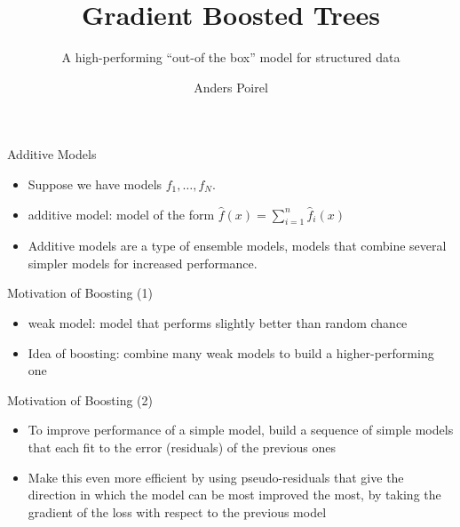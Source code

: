 \documentclass{beamer}
\title{Gradient Boosted Trees}
\subtitle{A high-performing ``out-of the box'' model for structured data}
\author{Anders Poirel}
\institute{DSS@UCSC}
\begin{document}
\maketitle

    \begin{frame}{Additive Models}
        \begin{itemize}
            \item Suppose we have models $f_1, \ldots, f_N$.
            \item \alert{additive model}: model of the form $\hat{f}(x) = \sum_{i = 1}^n \hat{f}_i (x)$
        
            \item Additive models are a type of \alert{ensemble} models, models that combine several simpler models for increased performance. 
        \end{itemize}   
    \end{frame}

    \begin{frame}{Motivation of Boosting (1)}
        \begin{itemize}
            \item \alert{weak} model: model that performs slightly better than random  chance
            \item Idea of \alert{boosting}: combine many weak models to build a higher-performing one
        \end{itemize}
    \end{frame}

    \begin{frame}{Motivation of Boosting (2)}
        \begin{itemize}
            \item To improve performance of a simple model, build a \alert{sequence} of simple models that each fit to the error (\alert{residuals}) of the previous ones
            \item Make this even more efficient by using \alert{pseudo-residuals} that give the direction in which the model can be most improved the most, by taking the gradient of the loss with respect to the previous model
        \end{itemize}
    \end{frame}
\end{document}
